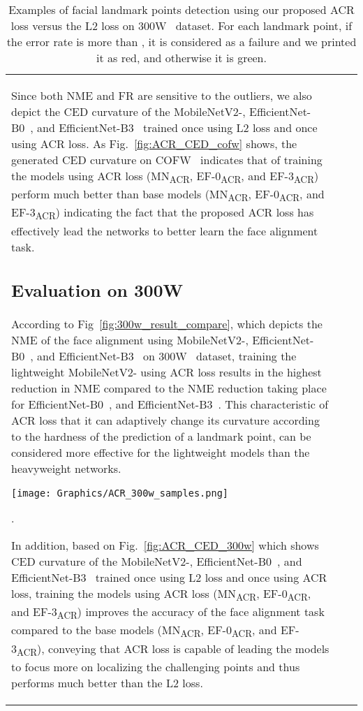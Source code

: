 \documentclass[a4paper,conference]{IEEEtran}
\begin{document}
\begin{table}[t!]
{\begin{tabular}{l c c}
Since both NME and FR are sensitive to the outliers, we also depict the CED curvature of the MobileNetV2-\cite{sandler2018mobilenetv2}, EfficientNet-B0~\cite{tan2020efficientnet}, and EfficientNet-B3~\cite{tan2020efficientnet} trained once using L2 loss and once using ACR loss. As Fig.~\ref{fig:ACR_CED_cofw} shows, the generated CED curvature on COFW~\cite{burgos2013robust} indicates that of training the models using ACR loss (MN\textsubscript{ACR}, EF-0\textsubscript{ACR}, and EF-3\textsubscript{ACR})
perform much better than base models (MN\textsubscript{ACR}, EF-0\textsubscript{ACR}, and EF-3\textsubscript{ACR}) indicating the fact that the proposed ACR loss has effectively lead the networks to better learn the face alignment task.



\subsection{Evaluation on 300W}
According to Fig~\ref{fig:300w_result_compare}, which depicts the NME of the face alignment using MobileNetV2-\cite{sandler2018mobilenetv2}, EfficientNet-B0~\cite{tan2020efficientnet}, and EfficientNet-B3~\cite{tan2020efficientnet} on 300W~\cite{sagonas2013300} dataset, training the lightweight MobileNetV2-\cite{sandler2018mobilenetv2} using ACR loss results in the highest reduction in NME compared to the NME reduction taking place for EfficientNet-B0~\cite{tan2020efficientnet}, and EfficientNet-B3~\cite{tan2020efficientnet}. This characteristic of ACR loss that it can adaptively change its curvature according to the hardness of the prediction of a landmark point, can be considered more effective for the lightweight models than the heavyweight networks. 
\begin{figure*}[t!]
  \centering
  \texttt{[image: Graphics/ACR\_300w\_samples.png]}
  \caption{Examples of facial landmark points detection using our proposed ACR loss versus the L2 loss on 300W~\cite{sagonas2013300} dataset. For each landmark point, if the error rate is more than , it is considered as a failure and we printed it as red, and otherwise it is green.}.
  \label{fig:ACR_300w_samples}
\end{figure*}


In addition, based on Fig.~\ref{fig:ACR_CED_300w} which shows CED curvature of the MobileNetV2-\cite{sandler2018mobilenetv2}, EfficientNet-B0~\cite{tan2020efficientnet}, and EfficientNet-B3~\cite{tan2020efficientnet} trained once using L2 loss and once using ACR loss, training the models using ACR loss (MN\textsubscript{ACR}, EF-0\textsubscript{ACR}, and EF-3\textsubscript{ACR}) improves the accuracy of the face alignment task compared to the base models (MN\textsubscript{ACR}, EF-0\textsubscript{ACR}, and EF-3\textsubscript{ACR}), conveying that ACR loss is capable of leading the models to focus more on localizing the challenging points and thus performs much better than the L2 loss.


\end{tabular}}
\end{table}
\end{document}
